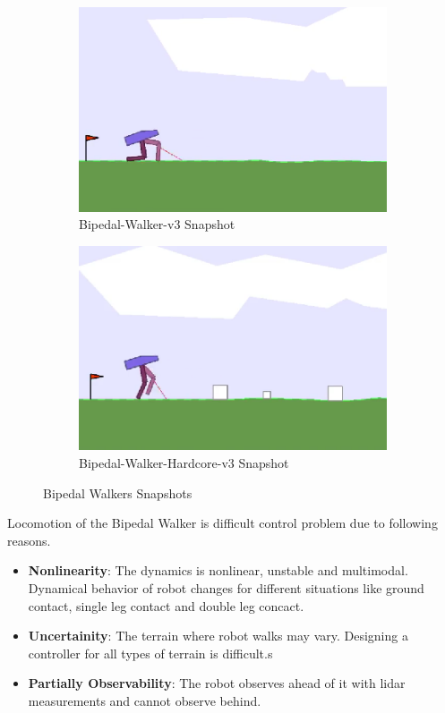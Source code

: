 \begin{figure}
	\begin{subfigure}{.5\textwidth}
		\centering
		\includegraphics[width=0.9\linewidth]{figures/bipedal/classic.png}
		\caption{Bipedal-Walker-v3 Snapshot}
		\label{fig:bipedal_walker_classic}
	\end{subfigure}
	\begin{subfigure}{.5\textwidth}
		\centering
		\includegraphics[width=0.9\linewidth]{figures/bipedal/hardcore.png}
		\caption{Bipedal-Walker-Hardcore-v3 Snapshot}
		\label{fig:bipedal_walker_hardcore}
	\end{subfigure}
	\caption{Bipedal Walkers Snapshots}
	\label{fig:bipedal_walkers}
\end{figure}
Locomotion of the Bipedal Walker is difficult control problem due to following reasons. \\
\begin{itemize}
	\item \textbf{Nonlinearity}: The dynamics is nonlinear, unstable and multimodal. Dynamical behavior of robot changes for different situations like ground contact, single leg contact and double leg concact. 
	\item \textbf{Uncertainity}: The terrain where robot walks may vary. Designing a controller for all types of terrain is difficult.s
	\item \textbf{Partially Observability}: The robot observes ahead of it with lidar measurements and cannot observe behind. 
\end{itemize}

